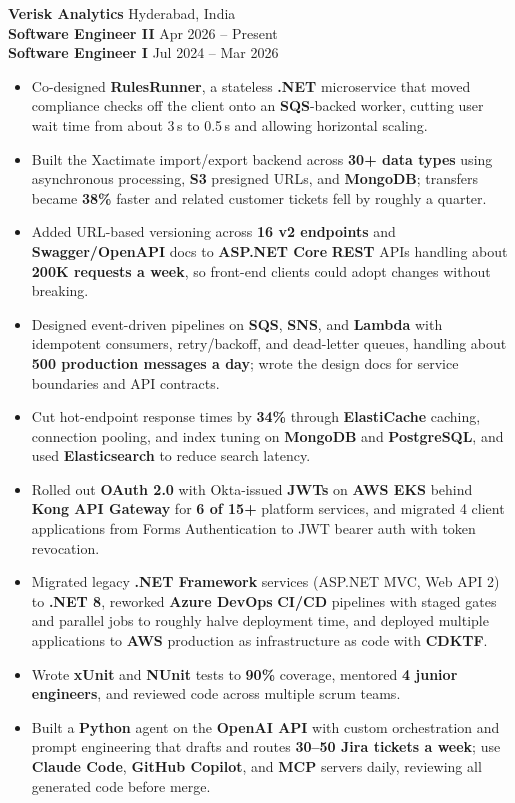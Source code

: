 \documentclass[a4paper,10pt]{article}
\begin{document}
\textbf{Verisk Analytics} \hfill Hyderabad, India \\
\textbf{Software Engineer II} \hfill Apr 2026 -- Present \\
\textbf{Software Engineer I} \hfill Jul 2024 -- Mar 2026

\begin{itemize}[leftmargin=*]
    \item Co-designed \textbf{RulesRunner}, a stateless \textbf{.NET} microservice that moved compliance checks off the client onto an \textbf{SQS}-backed worker, cutting user wait time from about 3\,s to 0.5\,s and allowing horizontal scaling.
    \item Built the Xactimate import/export backend across \textbf{30+ data types} using asynchronous processing, \textbf{S3} presigned URLs, and \textbf{MongoDB}; transfers became \textbf{38\%} faster and related customer tickets fell by roughly a quarter.
    \item Added URL-based versioning across \textbf{16 v2 endpoints} and \textbf{Swagger/OpenAPI} docs to \textbf{ASP.NET Core} \textbf{REST} APIs handling about \textbf{200K requests a week}, so front-end clients could adopt changes without breaking.
    \item Designed event-driven pipelines on \textbf{SQS}, \textbf{SNS}, and \textbf{Lambda} with idempotent consumers, retry/backoff, and dead-letter queues, handling about \textbf{500 production messages a day}; wrote the design docs for service boundaries and API contracts.
    \item Cut hot-endpoint response times by \textbf{34\%} through \textbf{ElastiCache} caching, connection pooling, and index tuning on \textbf{MongoDB} and \textbf{PostgreSQL}, and used \textbf{Elasticsearch} to reduce search latency.
    \item Rolled out \textbf{OAuth 2.0} with Okta-issued \textbf{JWTs} on \textbf{AWS EKS} behind \textbf{Kong API Gateway} for \textbf{6 of 15+} platform services, and migrated 4 client applications from Forms Authentication to JWT bearer auth with token revocation.
    \item Migrated legacy \textbf{.NET Framework} services (ASP.NET MVC, Web API 2) to \textbf{.NET 8}, reworked \textbf{Azure DevOps} \textbf{CI/CD} pipelines with staged gates and parallel jobs to roughly halve deployment time, and deployed multiple applications to \textbf{AWS} production as infrastructure as code with \textbf{CDKTF}.
    \item Wrote \textbf{xUnit} and \textbf{NUnit} tests to \textbf{90\%} coverage, mentored \textbf{4 junior engineers}, and reviewed code across multiple scrum teams.
    \item Built a \textbf{Python} agent on the \textbf{OpenAI API} with custom orchestration and prompt engineering that drafts and routes \textbf{30--50 Jira tickets a week}; use \textbf{Claude Code}, \textbf{GitHub Copilot}, and \textbf{MCP} servers daily, reviewing all generated code before merge.
\end{itemize}
\end{document}
